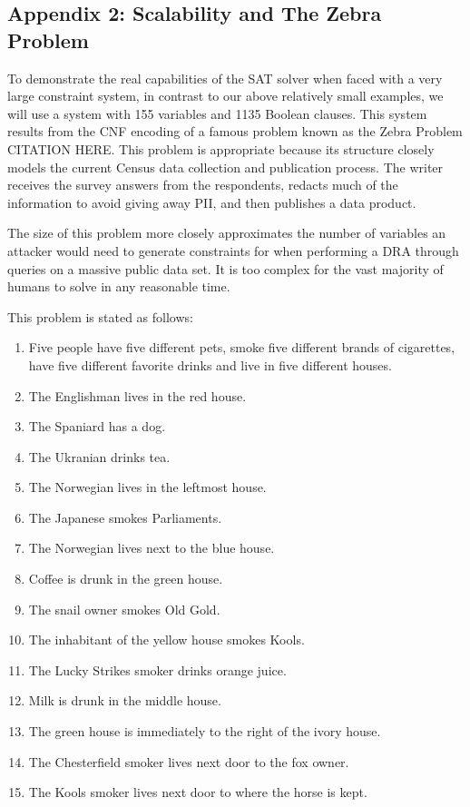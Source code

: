 \documentclass[jou,apacite]{apa6}
\begin{document}
\subsection{Appendix 2: Scalability and The Zebra Problem}

To demonstrate the real capabilities of the SAT solver when faced with a very large constraint system, in contrast to our above relatively small examples, we will use a system with 155 variables and 1135 Boolean clauses. This system results from the CNF encoding of a famous problem known as the Zebra Problem CITATION HERE.
This problem is appropriate because its structure closely models the current Census data collection and publication process. The writer receives the survey answers from the respondents, redacts much of the information to avoid giving away PII, and then publishes a data product.

The size of this problem more closely approximates the number
of variables an attacker would need to generate constraints for when performing a DRA through queries on a massive public data set. It is too complex for the vast majority of humans to solve in any reasonable time.

This problem is stated as follows:

\begin{enumerate}
\item Five people have five different pets, smoke five different
       brands of cigarettes, have five different favorite drinks and
       live in five different houses.
\item The Englishman lives in the red house.
\item The Spaniard has a dog.
\item The Ukranian drinks tea.
\item The Norwegian lives in the leftmost house.
\item The Japanese smokes Parliaments.
\item The Norwegian lives next to the blue house.
\item Coffee is drunk in the green house.
\item The snail owner smokes Old Gold.
\item The inhabitant of the yellow house smokes Kools.
\item The Lucky Strikes smoker drinks orange juice.
\item Milk is drunk in the middle house.
\item The green house is immediately to the right of the ivory house.
\item The Chesterfield smoker lives next door to the fox owner.
\item The Kools smoker lives next door to where the horse is kept.
\end{enumerate}
\end{document}
